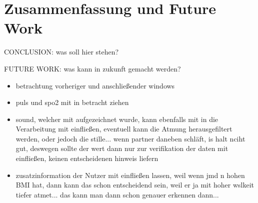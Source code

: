 
\chapter{Zusammenfassung und Future Work}
\label{ch:FutureWork}
%
CONCLUSION: was soll hier stehen?

FUTURE WORK: was kann in zukunft gemacht werden?

\begin{itemize}
    \item betrachtung vorheriger und anschließender windows
    \item puls und spo2 mit in betracht ziehen
    \item sound, welcher mit aufgezeichnet wurde, kann ebenfalls mit in die Verarbeitung mit einfließen, eventuell kann die Atmung herausgefiltert werden, oder jedoch die stille... wenn partner daneben schläft, is halt nciht gut, deswegen sollte der wert dann nur zur verifikation der daten mit einfließen, keinen entscheidenen hinweis liefern
    \item zusatzinformation der Nutzer mit einfließen lassen, weil wenn jmd n hohen BMI hat, dann kann das schon entscheidend sein, weil er ja mit hoher wslkeit tiefer atmet... das kann man dann schon genauer erkennen dann...
\end{itemize}
